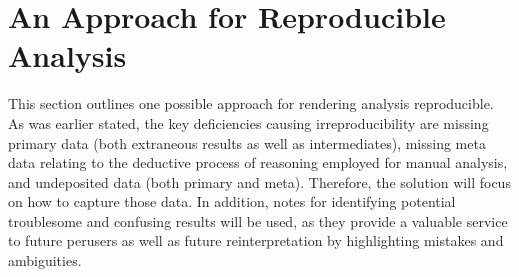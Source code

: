 \section{An Approach for Reproducible Analysis}
This section outlines one possible approach for rendering analysis reproducible.
As was earlier stated, the key deficiencies causing irreproducibility are 
missing primary data (both extraneous results as well as intermediates), 
missing meta data relating to the deductive process of reasoning employed 
for manual analysis, and undeposited data (both primary and meta).  Therefore, 
the solution will focus on how to capture those data.  In addition, notes for 
identifying potential troublesome and confusing results will be used, as they 
provide a valuable service to future perusers as well as future 
reinterpretation by highlighting mistakes and ambiguities.

